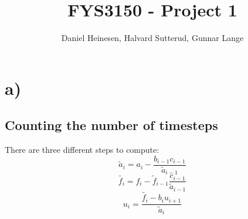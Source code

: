 \documentclass[a4paper, 10pt]{article}
\title{FYS3150 - Project 1}
\author{Daniel Heinesen, Halvard Sutterud, Gunnar Lange}
\begin{document}
\maketitle
\section*{a)}
\subsection*{Counting the number of timesteps}
There are three different steps to compute:
\begin{equation}
\tilde{a}_i=a_i-\frac{b_{i-1}c_{i-1}}{\tilde{a}_{i-1}}
\end{equation}
\begin{equation}
\tilde{f_i}=f_i-\tilde{f}_{i-1}\frac{c_{i-1}}{\tilde{a}_{i-1}}
\end{equation}
\begin{equation}
u_i=\frac{\tilde{f_i}-b_iu_{i+1}}{\tilde{a}_i}
\end{equation}
\end{document}
